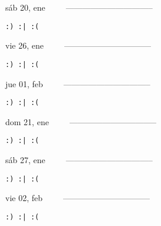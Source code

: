 \documentclass[letterpaper,10pt]{article}
\begin{document}
\begin{multicols}{3}
{sáb 20, ene\ \ \ \ \ --------------------------------}
\begin{flushright}\begin{small}\texttt{:) :| :(}\end{small}\end{flushright}
\vfill
{vie 26, ene\ \ \ \ \ --------------------------------}
\begin{flushright}\begin{small}\texttt{:) :| :(}\end{small}\end{flushright}\par
\vfill
{jue 01, feb\ \ \ \ \ --------------------------------}
\begin{flushright}\begin{small}\texttt{:) :| :(}\end{small}\end{flushright}\par
\vfill
\end{multicols}
\vspace{1.05cm}

\begin{multicols}{3}
{dom 21, ene\ \ \ \ \ --------------------------------}
\begin{flushright}\begin{small}\texttt{:) :| :(}\end{small}\end{flushright}
\vfill
{sáb 27, ene\ \ \ \ \ --------------------------------}
\begin{flushright}\begin{small}\texttt{:) :| :(}\end{small}\end{flushright}\par
\vfill
{vie 02, feb\ \ \ \ \ --------------------------------}
\begin{flushright}\begin{small}\texttt{:) :| :(}\end{small}\end{flushright}\par
\vfill
\end{multicols}
\vspace{1.05cm}
\end{document}
